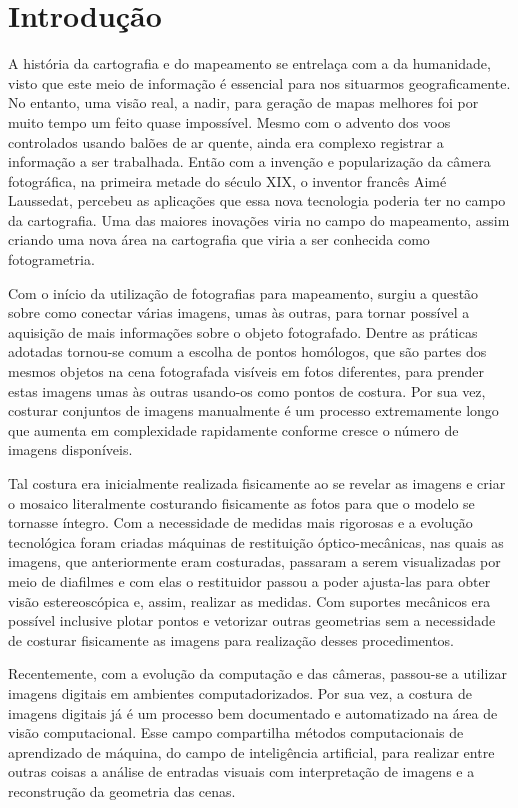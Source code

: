 \chapter*{Introdução}

A história da cartografia e do mapeamento se entrelaça com a da humanidade, visto que este meio de informação é essencial para nos situarmos geograficamente. No entanto, uma visão real, a nadir, para geração de mapas melhores foi por muito tempo um feito quase impossível. 
Mesmo com o advento dos voos controlados usando balões de ar quente, ainda era complexo registrar a informação a ser trabalhada. Então com a invenção e popularização da câmera fotográfica, na primeira metade do século XIX, o inventor francês Aimé Laussedat, percebeu as aplicações que essa nova tecnologia poderia ter no campo da cartografia. Uma das maiores inovações viria no campo do mapeamento, assim criando uma nova área na cartografia que viria a ser conhecida como fotogrametria.

Com o início da utilização de fotografias para mapeamento, surgiu a questão sobre como conectar várias imagens, umas às outras, para tornar possível a aquisição de mais informações sobre o objeto fotografado. Dentre as práticas adotadas tornou-se comum a escolha de pontos homólogos, que são partes dos mesmos objetos na cena fotografada visíveis em fotos diferentes, para prender estas imagens umas às outras usando-os como pontos de costura. Por sua vez, costurar conjuntos de imagens manualmente é um processo extremamente longo que aumenta em complexidade rapidamente conforme cresce o número de imagens disponíveis.

Tal costura era inicialmente realizada fisicamente ao se revelar as imagens e criar o mosaico literalmente costurando fisicamente as fotos para que o modelo se tornasse íntegro. Com a necessidade de medidas mais rigorosas e a evolução tecnológica foram criadas máquinas de restituição óptico-mecânicas, nas quais as imagens, que anteriormente eram costuradas, passaram a serem visualizadas por meio de diafilmes e com elas o restituidor passou a poder ajusta-las para obter visão estereoscópica e, assim, realizar as medidas. Com suportes mecânicos era possível inclusive plotar pontos e vetorizar outras geometrias sem a necessidade de costurar fisicamente as imagens para realização desses procedimentos.

Recentemente, com a evolução da computação e das câmeras, passou-se a utilizar imagens digitais em ambientes computadorizados. Por sua vez, a costura de imagens digitais já é um processo bem documentado e automatizado na área de visão computacional. Esse campo compartilha métodos computacionais de aprendizado de máquina, do campo de inteligência artificial, para realizar entre outras coisas a análise de entradas visuais com interpretação de imagens e a reconstrução da geometria das cenas.

